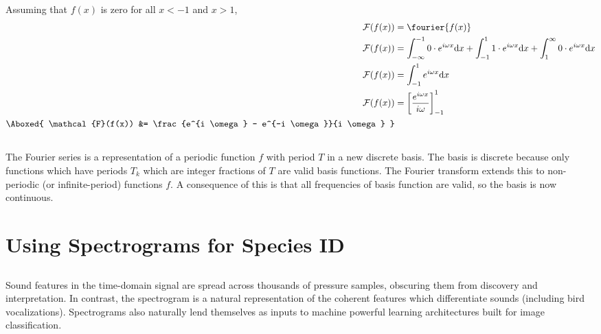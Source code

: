 \documentclass[11pt]{article}
\begin{document}
\subsection{} %
Assuming that $f(x)$ is zero for all $x<-1$ and $x>1$,
\begin{align*}
    \mathcal{F}(f(x)) &= \fourier{f(x)} \\
    \mathcal{F}(f(x)) &=
        \int_{-\infty}^{-1} 0 \cdot e^{i \omega x} \mathrm{d}x
        +\int_{-1}^{1} 1 \cdot e^{i \omega x} \mathrm{d}x
        + \int_{1}^{\infty} 0 \cdot e^{i \omega x} \mathrm{d}x \\
    \mathcal{F}(f(x)) &= \int_{-1}^{1} e^{i \omega x} \mathrm{d}x \\
    \mathcal{F}(f(x)) &= \left[ \frac{e^{i \omega x}}{i \omega} \right]_{-1}^{1} \\
    \Aboxed{
        \mathcal{F}(f(x)) &= \frac{e^{i \omega} - e^{-i \omega}}{i \omega}
        }
\end{align*}

\subsection{} %
\begin{mdframed}
    The Fourier series is a representation of a periodic function $f$ with
    period $T$ in a new discrete basis. The basis is discrete because only
    functions which have periods $T_k$ which are integer fractions of $T$ are
    valid basis functions. The Fourier transform extends this to non-periodic
    (or infinite-period) functions $f$. A consequence of this is that all
    frequencies of basis function are valid, so the basis is now continuous.
\end{mdframed}

\section{Using Spectrograms for Species ID}

\subsection{} %
\begin{mdframed}
    Sound features in the time-domain signal are spread across thousands of
    pressure samples, obscuring them from discovery and interpretation. In
    contrast, the spectrogram is a natural representation of the coherent
    features which differentiate sounds (including bird vocalizations).
    Spectrograms also naturally lend themselves as inputs to machine powerful
    learning architectures built for image classification.
\end{mdframed}
\end{document}
